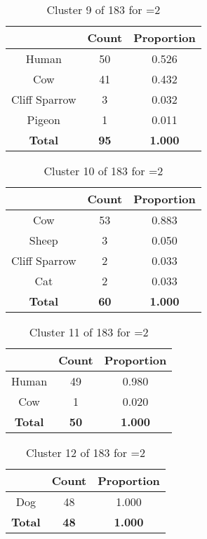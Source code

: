 \begin{table}[ht!]
\centering
\begin{tabular}{|c|c|c|}
\hline
\bf \Spec{} &\bf Count &\bf Proportion\\ \hline \hline
Human & 50 & 0.526\\ \hline
Cow & 41 & 0.432\\ \hline
Cliff Sparrow & 3 & 0.032\\ \hline
Pigeon & 1 & 0.011\\ \hline
\hline
\bf Total & \bf 95 & \bf 1.000\\ \hline
\end{tabular}
\label{tab:cluster:9:2}
\caption{Cluster 9 of 183 for \minneigh{}=2}
\end{table}

\clearpage
\begin{table}[ht!]
\centering
\begin{tabular}{|c|c|c|}
\hline
\bf \Spec{} &\bf Count &\bf Proportion\\ \hline \hline
Cow & 53 & 0.883\\ \hline
Sheep & 3 & 0.050\\ \hline
Cliff Sparrow & 2 & 0.033\\ \hline
Cat & 2 & 0.033\\ \hline
\hline
\bf Total & \bf 60 & \bf 1.000\\ \hline
\end{tabular}
\label{tab:cluster:10:2}
\caption{Cluster 10 of 183 for \minneigh{}=2}
\end{table}

\begin{table}[ht!]
\centering
\begin{tabular}{|c|c|c|}
\hline
\bf \Spec{} &\bf Count &\bf Proportion\\ \hline \hline
Human & 49 & 0.980\\ \hline
Cow & 1 & 0.020\\ \hline
\hline
\bf Total & \bf 50 & \bf 1.000\\ \hline
\end{tabular}
\label{tab:cluster:11:2}
\caption{Cluster 11 of 183 for \minneigh{}=2}
\end{table}

\begin{table}[ht!]
\centering
\begin{tabular}{|c|c|c|}
\hline
\bf \Spec{} &\bf Count &\bf Proportion\\ \hline \hline
Dog & 48 & 1.000\\ \hline
\hline
\bf Total & \bf 48 & \bf 1.000\\ \hline
\end{tabular}
\label{tab:cluster:12:2}
\caption{Cluster 12 of 183 for \minneigh{}=2}
\end{table}

